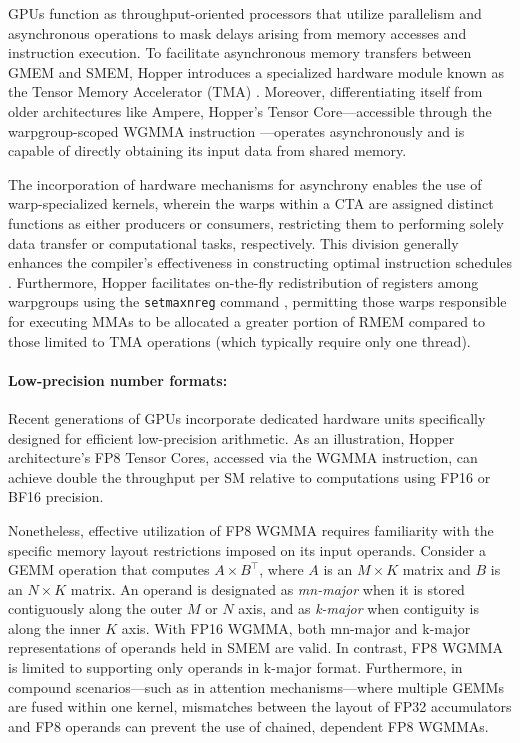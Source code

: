 GPUs function as throughput-oriented processors that utilize parallelism and asynchronous operations to mask delays arising from memory accesses and instruction execution. To facilitate asynchronous memory transfers between GMEM and SMEM, Hopper introduces a specialized hardware module known as the Tensor Memory Accelerator (TMA) \cite[\S7.29]{cuda}. Moreover, differentiating itself from older architectures like Ampere, Hopper’s Tensor Core—accessible through the warpgroup-scoped WGMMA instruction \cite[\S9.7.14]{ptx}—operates asynchronously and is capable of directly obtaining its input data from shared memory.

The incorporation of hardware mechanisms for asynchrony enables the use of warp-specialized kernels, wherein the warps within a CTA are assigned distinct functions as either producers or consumers, restricting them to performing solely data transfer or computational tasks, respectively. This division generally enhances the compiler’s effectiveness in constructing optimal instruction schedules \citep{warp-specialization-2011}. Furthermore, Hopper facilitates on-the-fly redistribution of registers among warpgroups using the \verb|setmaxnreg| command \cite[\S9.7.17.1]{ptx}, permitting those warps responsible for executing MMAs to be allocated a greater portion of RMEM compared to those limited to TMA operations (which typically require only one thread).

\paragraph{Low-precision number formats:}
\label{sec:low-precision-gpu}
Recent generations of GPUs incorporate dedicated hardware units specifically designed for efficient low-precision arithmetic. As an illustration, Hopper architecture’s FP8 Tensor Cores, accessed via the WGMMA instruction, can achieve double the throughput per SM relative to computations using FP16 or BF16 precision.

Nonetheless, effective utilization of FP8 WGMMA requires familiarity with the specific memory layout restrictions imposed on its input operands. Consider a GEMM operation that computes $A \times B^{\top}$, where $A$ is an $M\times K$ matrix and $B$ is an $N\times K$ matrix. An operand is designated as \emph{mn-major} when it is stored contiguously along the outer $M$ or $N$ axis, and as \emph{k-major} when contiguity is along the inner $K$ axis. With FP16 WGMMA, both mn-major and k-major representations of operands held in SMEM are valid. In contrast, FP8 WGMMA is limited to supporting only operands in k-major format. Furthermore, in compound scenarios—such as in attention mechanisms—where multiple GEMMs are fused within one kernel, mismatches between the layout of FP32 accumulators and FP8 operands can prevent the use of chained, dependent FP8 WGMMAs.

